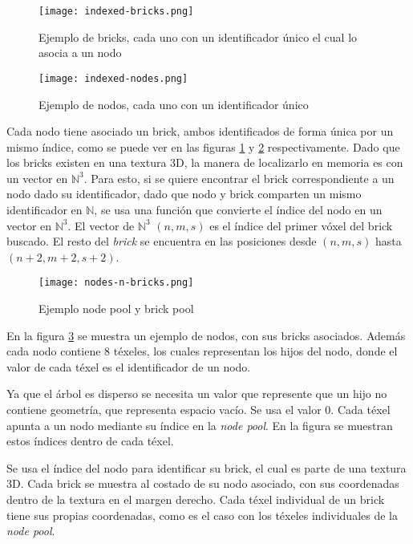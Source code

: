 \begin{figure}[h!]
    \centering
    \texttt{[image: indexed-bricks.png]}
    \caption{Ejemplo de bricks, cada uno con un identificador único el cual lo asocia a un nodo}
    \label{fig:indexed_bricks}
\end{figure}

\begin{figure}[h!]
    \centering
    \texttt{[image: indexed-nodes.png]}
    \caption{Ejemplo de nodos, cada uno con un identificador único}
    \label{fig:indexed_nodes}
\end{figure}

Cada nodo tiene asociado un brick, ambos identificados de forma única por un mismo índice, como se puede ver en las figuras \ref{fig:indexed_bricks} y \ref{fig:indexed_nodes} respectivamente.
Dado que los bricks existen en una textura 3D, la manera de localizarlo en memoria es con un vector en $\mathbb{N}^3$.
Para esto, si se quiere encontrar el brick correspondiente a un nodo dado su identificador, dado que nodo y brick comparten un mismo identificador en $\mathbb{N}$, se usa una función que convierte el índice del nodo en un vector en $\mathbb{N}^3$.
El vector de $\mathbb{N}^3$ $(n, m, s)$ es el índice del primer vóxel del brick buscado.
El resto del \textit{brick} se encuentra en las posiciones desde $(n, m, s)$ hasta $(n + 2, m + 2, s + 2)$.

\begin{figure}[h!]
    \centering
    \texttt{[image: nodes-n-bricks.png]}
    \caption{Ejemplo node pool y brick pool}
    \label{fig:nodes_n_bricks}
\end{figure}

En la figura \ref{fig:nodes_n_bricks} se muestra un ejemplo de nodos, con sus bricks asociados.
Además cada nodo contiene $8$ téxeles, los cuales representan los hijos del nodo, donde el valor de cada téxel es el identificador de un nodo.

Ya que el árbol es disperso se necesita un valor que represente que un hijo no contiene geometría, que representa espacio vacío.
Se usa el valor 0.
Cada téxel apunta a un nodo mediante su índice en la \textit{node pool}.
En la figura se muestran estos índices dentro de cada téxel.

Se usa el índice del nodo para identificar su brick, el cual es parte de una textura 3D.
Cada brick se muestra al costado de su nodo asociado, con sus coordenadas dentro de la textura en el margen derecho.
Cada téxel individual de un brick tiene sus propias coordenadas, como es el caso con los téxeles individuales de la \textit{node pool}.

